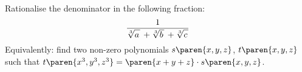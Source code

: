 Rationalise the denominator in the following fraction:
\begin{equation*}
  \frac{1}{
           \sqrt[3]{a \vphantom{bc} \mspace{2mu}} \,
           + \sqrt[3]{b \vphantom{ac} \mspace{2mu}} \,
           + \sqrt[3]{c \vphantom{ab} \mspace{2mu}}
          }
\end{equation*}
Equivalently: \newline
find two non-zero polynomials $s\paren{x,y,z}$, $t\paren{x,y,z}$
such that $t\paren{x^3, y^3, z^3} = \paren{x + y + z} \cdot s\paren{x,y,z}$.

